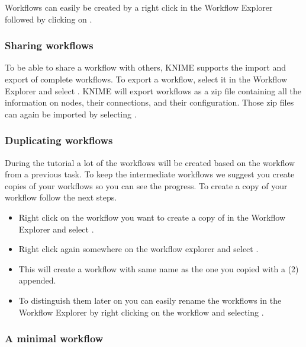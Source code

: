 Workflows can easily be created by a right click in the Workflow Explorer followed by clicking on .

\subsubsection{Sharing workflows}
\label{sec:sharing_workflows}

To be able to share a workflow with others, KNIME supports the import and export of complete workflows.
To export a workflow, select it in the Workflow Explorer and select .
KNIME will export workflows as a zip file containing all the information on nodes, their connections, and their configuration.
Those zip files can again be imported by selecting .


\subsubsection{Duplicating workflows}
\label{sec:duplicate-wf}

During the tutorial a lot of the workflows will be created based on the workflow from a previous task.
To keep the intermediate workflows we suggest you create copies of your workflows so you can see the progress.
To create a copy of your workflow follow the next steps.

\begin{itemize}
\item
Right click on the workflow you want to create a copy of in the Workflow Explorer and select .
\item
Right click again somewhere on the workflow explorer and select .
\item
This will create a workflow with same name as the one you copied with a (2) appended.
\item
To distinguish them later on you can easily rename the workflows in the Workflow Explorer by right clicking on the workflow and selecting . 
\end{itemize}

\subsubsection{A minimal workflow}
\label{Minimal_Workflow}

